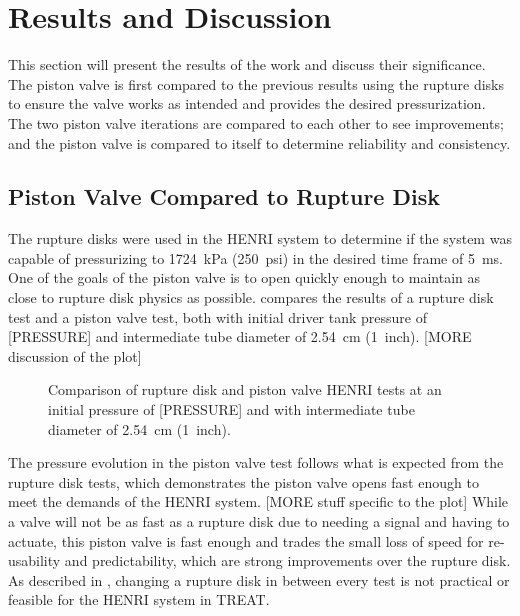 \section{Results and Discussion} \label{s:results}
This section will present the results of the work and discuss their significance. The piston valve is first compared to the previous results using the rupture disks to ensure the valve works as intended and provides the desired pressurization. The two piston valve iterations are compared to each other to see improvements; and the piston valve is compared to itself to determine reliability and consistency.

\subsection{Piston Valve Compared to Rupture Disk} \label{s:disk v piston}
The rupture disks were used in the HENRI system to determine if the system was capable of pressurizing to \SI{1724}{\kilo\pascal} (\SI{250}{psi}) in the desired time frame of \SI{5}{\milli\second}\cite{HeNURETH}. One of the goals of the piston valve is to open quickly enough to maintain as close to rupture disk physics as possible. 
 compares the results of a rupture disk test and a piston valve test, both with initial driver tank pressure of [PRESSURE] and intermediate tube diameter of \SI{2.54}{\centi\meter} (\SI{1}{inch}). [MORE discussion of the plot]

\begin{figure}[htbp]
    \vspace{16pt}
    \centering
    \caption{Comparison of rupture disk and piston valve HENRI tests at an initial pressure of [PRESSURE] and with intermediate tube diameter of \SI{2.54}{\centi\meter} (\SI{1}{inch}).}
    \label{fig:disk v piston}
    \vspace{16pt}
\end{figure}

The pressure evolution in the piston valve test follows what is expected from the rupture disk tests, which demonstrates the piston valve opens fast enough to meet the demands of the HENRI system. [MORE stuff specific to the plot] While a valve will not be as fast as a rupture disk due to needing a signal and having to actuate, this piston valve is fast enough and trades the small loss of speed for re-usability and predictability, which are strong improvements over the rupture disk. As described in , changing a rupture disk in between every test is not practical or feasible for the HENRI system in TREAT.


